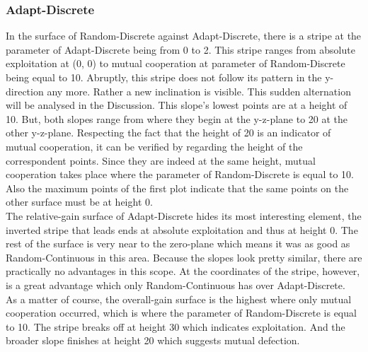 \documentclass[11pt]{article}
\begin{document}
\subsubsection*{Adapt-Discrete}
		In the surface of Random-Discrete against Adapt-Discrete, there is a stripe at the parameter of Adapt-Discrete being from 0 to 2.
		This stripe ranges from absolute exploitation at (0, 0) to mutual cooperation at parameter of Random-Discrete being equal to 10.
		Abruptly, this stripe does not follow its pattern in the y-direction any more.
		Rather a new inclination is visible.
		This sudden alternation will be analysed in the Discussion. 
		This slope's lowest points are at a height of 10.
		But, both slopes range from where they begin at the y-z-plane to 20 at the other y-z-plane.
		Respecting the fact that the height of 20 is an indicator of mutual cooperation, it can be verified by regarding the height of the correspondent points.
		Since they are indeed at the same height, mutual cooperation takes place where the parameter of Random-Discrete is equal to 10.
		Also the maximum points of the first plot indicate that the same points on the other surface must be at height 0.\\

		The relative-gain surface of Adapt-Discrete hides its most interesting element, the inverted stripe that leads ends at absolute exploitation and thus at height 0.
		The rest of the surface is very near to the zero-plane which means it was as good as Random-Continuous in this area.
		Because the slopes look pretty similar, there are practically no advantages in this scope.
		At the coordinates of the stripe, however, is a great advantage which only Random-Continuous has over Adapt-Discrete.\\

		As a matter of course, the overall-gain surface is the highest where only mutual cooperation occurred, which is where the parameter of Random-Discrete is equal to 10.
		The stripe breaks off at height 30 which indicates exploitation.
		And the broader slope finishes at height 20 which suggests mutual defection.\\
\end{document}
